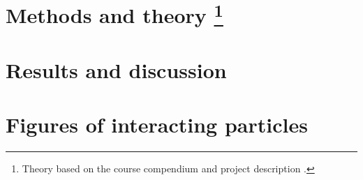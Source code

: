 \documentclass[12pt,a4paper,twocolumn]{article}
\begin{document}






\section{Methods and theory \protect\footnote{
Theory based on the course compendium and project description \cite{prosjekttbeskrivelse4}.
}}\label{sec:methods_and_theory}




\section{Results and discussion}\label{sec:results_and_discussion}








\newpage 
\twocolumn[
\printbibliography
]
\newpage
\onecolumn

\appendix


\section{Figures of interacting particles}
\end{document}
